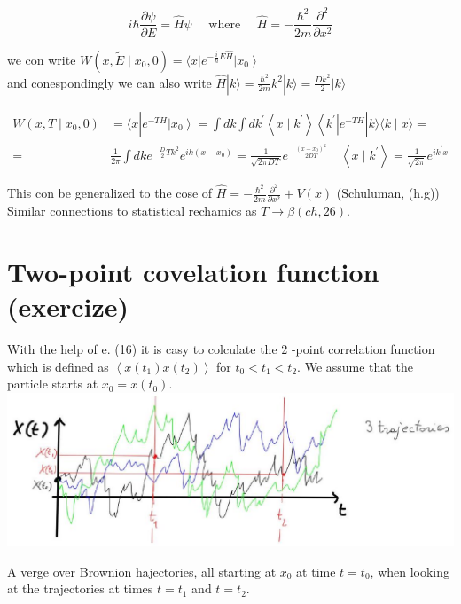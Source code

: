\documentclass[10pt]{article}
\begin{document}
$$
i \hbar \frac{\partial \psi}{\partial E}=\hat{H} \psi \quad \text { where } \quad \hat{H}=-\frac{\hbar^{2}}{2 m} \frac{\partial^{2}}{\partial x^{2}}
$$

we con write $W\left(x, \tilde{E} \mid x_{0}, 0\right)=\langle x| e^{-\frac{i}{\hbar} \tilde{E} \hat{H}}\left|x_{0}\right\rangle$\\
and conespondingly we can also write $\hat{H}|k\rangle=\frac{\hbar^{2}}{2 m} k^{2}|k\rangle=\frac{D k^{2}}{2}|k\rangle$

$$
\begin{aligned}
W\left(x, T \mid x_{0}, 0\right) & =\langle x| e^{-T H}\left|x_{0}\right\rangle=\int d k \int d k^{\prime}\left\langle x \mid k^{\prime}\right\rangle\left\langle k^{\prime}\right| e^{-T H}|k\rangle\langle k \mid x\rangle= \\
= & \frac{1}{2 \pi} \int d k e^{-\frac{D}{2} T k^{2}} e^{i k\left(x-x_{0}\right)}=\frac{1}{\sqrt{2 \pi D T}} e^{-\frac{\left(x-x_{0}\right)^{2}}{2 D T}} \quad\left\langle x \mid k^{\prime}\right\rangle=\frac{1}{\sqrt{2 \pi}} e^{i k^{\prime} x}
\end{aligned}
$$

This con be generalized to the cose of $\hat{H}=-\frac{\hbar^{2}}{2 m} \frac{\partial^{2}}{\partial x^{2}}+V(x)$ (Schuluman, (h.g)) Similar connections to statistical rechamics as $T \rightarrow \beta(c h, 26)$.

\section*{Two-point covelation function (exercize)}
With the help of e. (16) it is casy to colculate the 2 -point correlation function which is defined as $\left\langle x\left(t_{1}\right) x\left(t_{2}\right)\right\rangle$ for $t_{0}<t_{1}<t_{2}$. We assume that the particle starts at $x_{0}=x\left(t_{0}\right)$.\\
\includegraphics[max width=\textwidth, center]{2025_10_17_55d6813539323d2293f0g-4}

A verge over Brownion hajectories, all starting at $x_{0}$ at time $t=t_{0}$, when looking at the trajectories at times $t=t_{1}$ and $t=t_{2}$.
\end{document}
